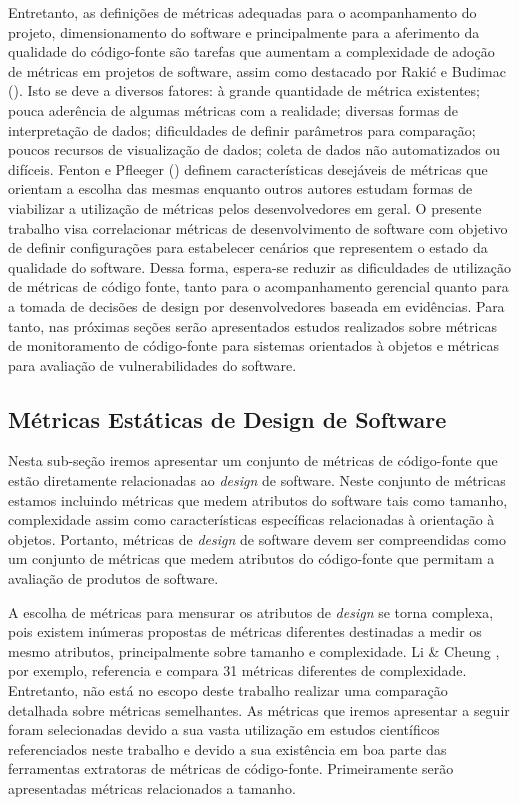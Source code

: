 %

Entretanto, as definições de métricas adequadas para o acompanhamento do projeto, dimensionamento do software e principalmente para a aferimento da qualidade do código-fonte são tarefas que aumentam a complexidade de adoção de métricas em projetos de software, assim como destacado por Rakić e Budimac (\citeyear{rakic2011budimac}).
%
Isto se deve a diversos fatores: à grande quantidade de métrica existentes; pouca aderência de algumas métricas com a realidade; diversas formas de interpretação de dados; dificuldades de definir parâmetros para comparação; poucos recursos de visualização de dados; coleta de dados não automatizados ou difíceis.
%
Fenton e Pfleeger (\citeyear{fenton1998}) definem características desejáveis de métricas que orientam a escolha das mesmas enquanto outros autores estudam formas de viabilizar a utilização de métricas pelos desenvolvedores em geral\cite{meirelles2013metrics,almeida2010}.
%
O presente trabalho visa correlacionar métricas de desenvolvimento de software com objetivo de definir configurações para estabelecer cenários que representem o estado da qualidade do software. Dessa forma, espera-se reduzir as dificuldades de utilização de métricas de código fonte, tanto para o acompanhamento gerencial quanto para a tomada de decisões de design por desenvolvedores baseada em evidências. Para tanto, nas próximas seções serão apresentados estudos realizados sobre métricas de monitoramento de código-fonte para sistemas orientados à objetos e métricas para avaliação de vulnerabilidades do software.

%

\subsection{Métricas Estáticas de Design de Software}

Nesta sub-seção iremos apresentar um conjunto de métricas de código-fonte que estão diretamente relacionadas ao \emph{design} de software. Neste conjunto de métricas estamos incluindo métricas que medem atributos do software tais como tamanho, complexidade assim como características específicas relacionadas à orientação à objetos. Portanto, métricas de \emph{design} de software devem ser compreendidas como um conjunto de métricas que medem atributos do código-fonte que permitam a avaliação de produtos de software.

%

A escolha de métricas para mensurar os atributos de \emph{design} se torna complexa, pois existem inúmeras propostas de métricas diferentes destinadas a medir os mesmo atributos, principalmente sobre tamanho e complexidade. Li \& Cheung \citeyear{li1987}, por exemplo, referencia e compara 31 métricas diferentes de complexidade. Entretanto, não está no escopo deste trabalho realizar uma comparação detalhada sobre métricas semelhantes. As métricas que iremos apresentar a seguir foram selecionadas devido a sua vasta utilização em estudos científicos referenciados neste trabalho e devido a sua existência em boa parte das ferramentas extratoras de métricas de código-fonte. Primeiramente serão apresentadas métricas relacionados a tamanho.

